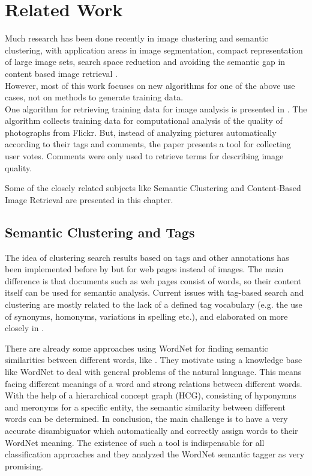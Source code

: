 \section{Related Work}
\label{sec_relatedwork}

Much research has been done recently in image clustering and semantic clustering, with application areas in image segmentation, compact representation of large image sets, search space reduction and avoiding the semantic gap in content based image retrieval \cite{Lim2011}. \\
However, most of this work focuses on new algorithms for one of the above use cases, not on methods to generate training data. \\

One algorithm for retrieving training data for image analysis is presented in \cite{Orendovici2010}. The algorithm collects training data for computational analysis of the quality of photographs from Flickr. But, instead of analyzing pictures automatically according to their tags and comments, the paper presents a tool for collecting user votes. Comments were only used to retrieve terms for describing image quality.

\bigskip

Some of the closely related subjects like Semantic Clustering and Content-Based Image Retrieval are presented in this chapter.

\subsection{Semantic Clustering and Tags}
The idea of clustering search results based on tags and other annotations has been implemented before by \cite{Ramage2009} but for web pages instead of images. The main difference is that documents such as web pages consist of words, so their content itself can be used for semantic analysis.
Current issues with tag-based search and clustering are mostly related to the lack of a defined tag vocabulary (e.g. the use of synonyms, homonyms, variations in spelling etc.), and elaborated on more closely in \cite{Auer2011}.

\bigskip

There are already some approaches using WordNet for finding semantic similarities between different words, like \cite{richardson1994using}. They motivate using a knowledge base like WordNet to deal with general problems of the natural language. This means facing different meanings of a word and strong relations between different words. With the help of a hierarchical concept graph (HCG), consisting of hyponymns and meronyms for a specific entity, the semantic similarity between different words can be determined. In conclusion, the main challenge is to have a very accurate disambiguator which automatically and correctly assign words to their WordNet meaning. The existence of such a tool is indispensable for all classification approaches and they analyzed the WordNet semantic tagger as very promising.

